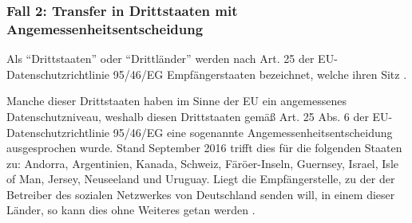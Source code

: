 \subsubsection{Fall 2: Transfer in Drittstaaten mit Angemessenheitsentscheidung}
Als "`Drittstaaten"' oder "`Drittländer"' werden nach Art. 25 der EU-Datenschutzrichtlinie 95/46/EG Empfängerstaaten bezeichnet, welche ihren Sitz \autocite[vgl.][]{LDI.2017} \autocite[vgl.][]{EG.1995}.
\par
Manche dieser Drittstaaten haben im Sinne der \ac{EU} ein angemessenes Datenschutzniveau, weshalb diesen Drittstaaten gemäß Art. 25 Abs. 6 der EU-Datenschutzrichtlinie 95/46/EG eine sogenannte Angemessenheitsentscheidung ausgesprochen wurde. Stand September 2016 trifft dies für die folgenden Staaten zu: Andorra, Argentinien, Kanada, Schweiz, Färöer-Inseln, Guernsey, Israel, Isle of Man, Jersey, Neuseeland und Uruguay. Liegt die Empfängerstelle, zu der der Betreiber des sozialen Netzwerkes von Deutschland senden will, in einem dieser Länder, so kann dies ohne Weiteres getan werden \autocite[vgl.][]{LDI.2017} \autocite[vgl.][]{EG.1995}.

